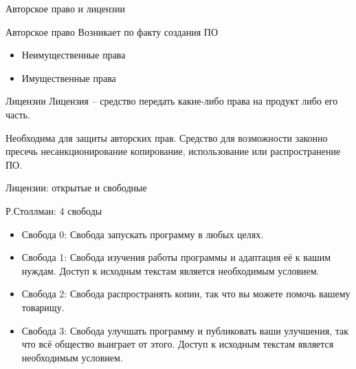 \begin{frame}{Авторское право и лицензии}

	\begin{block}{Авторское право}
		 Возникает по факту создания ПО 

		\begin{itemize}
			\item Неимущественные права
			\item Имущественные права
		\end{itemize}
	\end{block}

	\pause

	\begin{block}{Лицензии}
		Лицензия -- средство передать какие-либо права на продукт либо его часть.

		Необходима для защиты авторских прав. 
		Средство для возможности законно пресечь несанкционирование копирование,  использование или распространение ПО. 
	\end{block}
\end{frame}


\begin{frame}{Лицензии: открытые и свободные}
	\begin{block}{ Р.Столлман: 4 свободы}
		\begin{itemize}
			\item Свобода 0: Свобода запускать программу в любых целях.
			\item Свобода 1: Свобода изучения работы программы и адаптация её к вашим нуждам. 
				Доступ к исходным текстам является необходимым условием.
			\item Свобода 2: Свобода распространять копии,  так что вы можете помочь вашему товарищу.
			\item Свобода 3: Свобода улучшать программу и публиковать ваши улучшения,
				так что всё общество выиграет от этого.
				Доступ к исходным текстам является необходимым условием.
		\end{itemize}
	\end{block}
\end{frame}


